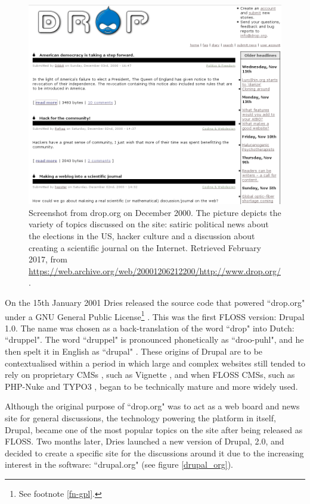 \begin{figure}[H]
	\centering
	\includegraphics[scale=0.4]{img/drop_org.png}
	\caption[Drop.org on  December 2000]%
    {Screenshot from drop.org on  December 2000. The picture depicts the variety of topics discussed on the site: satiric political news about the elections in the US, hacker culture and a discussion about creating a scientific journal on the Internet. Retrieved  February 2017, from \url{https://web.archive.org/web/20001206212200/http://www.drop.org/}.}
	\label{drop_org}
\end{figure}

On the 15th January 2001 Dries released the source code that powered ``drop.org" under a GNU General Public License\footnote{See footnote \ref{fn-gpl}.} \parencite{drupal-changelog:2013:Online}. This was the first FLOSS version: Drupal 1.0. The name was chosen as a back-translation of the word ``drop" into Dutch: ``druppel". The word ``druppel" is pronounced phonetically as ``droo-puhl", and he then spelt it in English as ``drupal"  \parencite{benjamin2011definitive, drupal-history:2017:Online}. These origins of Drupal are to be contextualised within a period in which large and complex websites still tended to rely on proprietary CMSs \parencite{cms-history:2017:Online, cms-proprietary:2017:Online}, such as Vignette \parencite{vignette:2017:Online}, and when FLOSS CMSs, such as PHP-Nuke \parencite{paterson2005building} and TYPO3 \parencite{typo3:2017:Online}, began to be technically mature and more widely used.

Although the original purpose of ``drop.org" was to act as a web board and news site for general discussions, the technology powering the platform in itself, Drupal, became one of the most popular topics on the site after being released as FLOSS. Two months later, Dries launched a new version of Drupal, 2.0, and decided to create a specific site for the discussions around it due to the increasing interest in the software: ``drupal.org" (see figure \ref{drupal_org}). 

